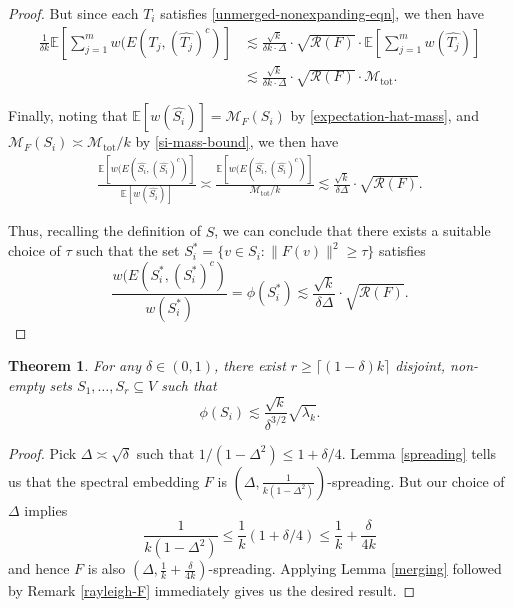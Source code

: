 \documentclass[a4paper,11pt]{article}
\newtheorem{theorem}{Theorem}[section]
\theoremstyle{definition}
\newcommand{\rayleigh}[1]{\mathcal{R}\left(#1\right)}
\newcommand{\E}[1]{\mathbb{E}\left[#1\right]}
\newcommand{\mass}[1]{\mathcal{M}_F\left(#1\right)}
\newcommand{\mtot}{\mathcal{M}_\mathrm{tot}}
\begin{document}
\begin{proof}
But since each $T_i$ satisfies \eqref{unmerged-nonexpanding-eqn}, we then have
\begin{align*}
\frac{1}{\delta k} \E{\sum_{j=1}^m w(E(\hat{T_j}, \left(\hat{T_j}\right)^c)}
&\lesssim \frac{\sqrt{k}}{\delta k \cdot \Delta} \cdot \sqrt{\rayleigh{F}} \cdot \E{\sum_{j=1}^m w(\hat{T_j}) } \\
&\lesssim \frac{\sqrt{k}}{\delta k \cdot \Delta} \cdot \sqrt{\rayleigh{F}} \cdot \mtot.
\end{align*}

Finally, noting that $\E{w(\hat{S_i})} = \mass{S_i}$ by \eqref{expectation-hat-mass}, and $\mass{S_i} \asymp \mtot/k$ by \eqref{si-mass-bound}, we then have
\begin{align*}
\frac{\E{w(E(\hat{S_i}, \left(\hat{S_i}\right)^c)}}{\E{w(\hat{S_i})}} \asymp \frac{\E{w(E(\hat{S_i}, \left(\hat{S_i}\right)^c)}}{\mtot/k} \lesssim 
\frac{\sqrt{k}}{\delta \Delta} \cdot \sqrt{\rayleigh{F}}.
\end{align*}

Thus, recalling the definition of $\hat{S}$, we can conclude that there exists a suitable choice of $\tau$ such that the set $S^*_i = \{ v \in S_i : \|F(v)\|^2 \ge \tau \}$ satisfies
\[
\frac{w(E(S^*_i, \left(S^*_i\right)^c)}{w(S^*_i)} = \phi(S^*_i) \lesssim \frac{\sqrt{k}}{\delta \Delta} \cdot \sqrt{\rayleigh{F}}.
\]

\end{proof}

\begin{theorem}\label{ho-cheeger-general}
For any $\delta \in (0, 1)$, there exist $r \ge \lceil(1 - \delta)k\rceil$ disjoint, non-empty sets $S_1, \dots, S_r \subseteq V$ such that
\[ \phi(S_i) \lesssim \frac{\sqrt{k}}{\delta^{3/2}} \sqrt{\lambda_k}. \]
\end{theorem}
\begin{proof}
Pick $\Delta \asymp \sqrt{\delta}$ such that $1/\left(1-\Delta^2\right) \le 1 + \delta/4$. 
Lemma \ref{spreading} tells us that the spectral embedding $F$ is $\left(\Delta, \frac{1}{k(1-\Delta^2)}\right)$-spreading. But our choice of $\Delta$ implies 
\[
\frac{1}{k(1-\Delta^2)} \le \frac{1}{k}(1 + \delta/4) \le \frac{1}{k} + \frac{\delta}{4k}
\]
and hence $F$ is also $\left(\Delta, \frac{1}{k} + \frac{\delta}{4k}\right)$-spreading. Applying Lemma \ref{merging} followed by Remark \ref{rayleigh-F} immediately gives us the desired result.
\end{proof}
\end{document}
